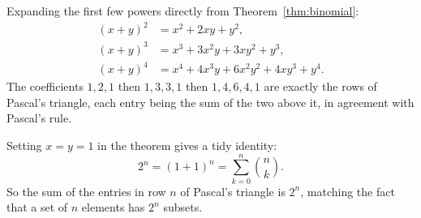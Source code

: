 \begin{example}
Expanding the first few powers directly from Theorem~\ref{thm:binomial}:
\begin{align*}
(x + y)^2 &= x^2 + 2xy + y^2, \\
(x + y)^3 &= x^3 + 3x^2 y + 3x y^2 + y^3, \\
(x + y)^4 &= x^4 + 4x^3 y + 6x^2 y^2 + 4x y^3 + y^4.
\end{align*}
The coefficients $1,2,1$ then $1,3,3,1$ then $1,4,6,4,1$ are exactly the rows of Pascal's triangle, each entry being the sum of the two above it, in agreement with Pascal's rule.
\end{example}

\begin{example}
Setting $x = y = 1$ in the theorem gives a tidy identity:
\[
2^n = (1 + 1)^n = \sum_{k=0}^{n} \binom{n}{k}.
\]
So the sum of the entries in row $n$ of Pascal's triangle is $2^n$, matching the fact that a set of $n$ elements has $2^n$ subsets.
\end{example}
